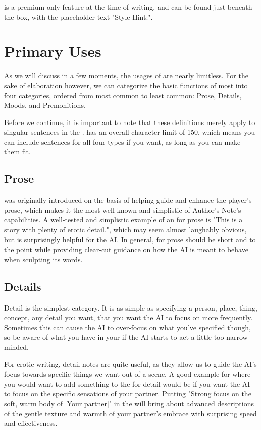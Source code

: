 ﻿\documentclass[Coomer-main.tex]{subfiles}
\begin{document}
\an is a premium-only feature at the time of writing, and can be found just beneath the \rem box, with the placeholder text "Style Hint:".

\section{Primary Uses}

As we will discuss in a few moments, the usages of \an are nearly limitless. For the sake of elaboration however, we can categorize the basic functions of most \ans into four categories, ordered from most common to least common: Prose, Details, Moods, and Premonitions.

Before we continue, it is important to note that these definitions merely apply to singular sentences in the \an. \an has an overall character limit of 150, which means you can include sentences for all four types if you want, as long as you can make them fit.

\subsection{Prose}

\an was originally introduced on the basis of helping guide and enhance the player's prose, which makes it the most well-known and simplistic of Author's Note's capabilities. A well-tested and simplistic example of an \an for prose is "This is a story with plenty of erotic detail.", which may seem almost laughably obvious, but is surprisingly helpful for the AI. In general, \ans for prose should be short and to the point while providing clear-cut guidance on how the AI is meant to behave when sculpting its words.

\subsection{Details}

Detail is the simplest \an category. It is as simple as specifying a person, place, thing, concept, any detail you want, that you want the AI to focus on more frequently. Sometimes this can cause the AI to over-focus on what you've specified though, so be aware of what you have in your \an if the AI starts to act a little too narrow-minded.

For erotic writing, detail notes are quite useful, as they allow us to guide the AI's focus towards specific things we want out of a scene. A good example for where you would want to add something to the \an for detail would be if you want the AI to focus on the specific sensations of your partner. Putting "Strong focus on the soft, warm body of [Your partner]" in the \an will bring about advanced descriptions of the gentle texture and warmth of your partner’s embrace with surprising speed and effectiveness.
\end{document}
